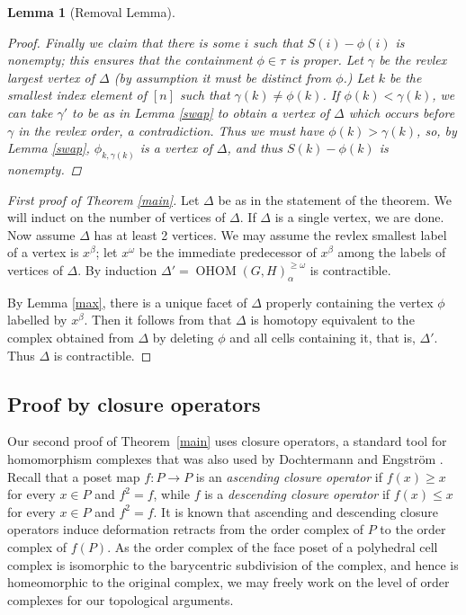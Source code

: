 \documentclass[11pt]{amsart}
\newtheorem{lemma}[theorem]{Lemma}
\theoremstyle{definition}
\numberwithin{equation}{section}
\theoremstyle{remark}
\numberwithin{equation}{section}
\begin{document}
\begin{lemma}[Removal Lemma]
\begin{proof}
Finally we claim that there is some $i$ such that $S(i) - \phi(i)$ is nonempty; this ensures that the containment $\phi \in \tau$ is proper. Let $\gamma$ be the revlex largest vertex of $\Delta$ (by assumption it must be distinct from $\phi$.) Let $k$ be the smallest index element of $[n]$ such that $\gamma(k) \neq \phi(k)$. If $\phi(k) < \gamma(k)$, we can take $\gamma'$ to be as in Lemma \ref{swap} to obtain a vertex of $\Delta$ which occurs before $\gamma$ in the revlex order, a contradiction. Thus we must have $\phi(k) > \gamma(k)$, so, by Lemma \ref{swap}, $\phi_{k,\gamma(k)}$ is a vertex of $\Delta$, and thus $S(k) - \phi(k)$ is nonempty.

\end{proof}

\end{lemma}

\begin{proof}[First proof of Theorem \ref{main}] 
Let $\Delta$ be as in the statement of the theorem. We will induct on the number of vertices of $\Delta$. If $\Delta$ is a single vertex, we are done. Now assume $\Delta$ has at least 2 vertices. We may assume the revlex smallest label of a vertex is $x^{\beta}$; let $x^{\omega}$ be the immediate predecessor of $x^{\beta}$ among the labels of vertices of $\Delta$. By induction $\Delta' = \operatorname{OHOM}(G,H)_{\alpha}^{\geq \omega}$ is contractible.

By Lemma \ref{max}, there is a unique facet of $\Delta$ properly containing the vertex $\phi$ labelled by $x^{\beta}$. Then it follows from  \cite[Lemma 6.4]{NagelReiner}  that $\Delta$ is homotopy equivalent to the complex obtained from $\Delta$ by deleting $\phi$ and all cells containing it, that is, $\Delta'$.  Thus $\Delta$ is contractible.

\end{proof}

\subsection{Proof by closure operators}

Our second proof of Theorem~\ref{main} uses closure operators, a standard tool for homomorphism complexes that was also used by Dochtermann and Engstr\"{o}m \cite{DochtermannEngstromCellular}.
Recall that a poset map $f:P\rightarrow P$ is an \emph{ascending closure operator} if $f(x)\geq x$ for every $x\in P$ and $f^2=f$, while $f$ is a \emph{descending closure operator} if $f(x)\leq x$ for every $x\in P$ and $f^2=f$.  
It is known \cite{BjornerSurvey} that ascending and descending closure operators induce deformation retracts from the order complex of $P$ to the order complex of $f(P)$.
As the order complex of the face poset of a polyhedral cell complex is isomorphic to the barycentric subdivision of the complex, and hence is homeomorphic to the original complex, we may freely work on the level of order complexes for our topological arguments.
\end{document}
